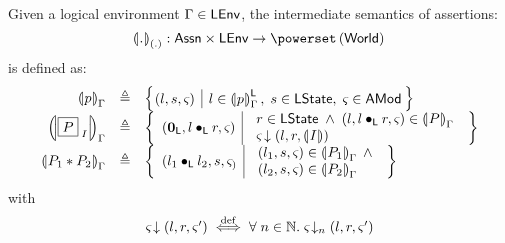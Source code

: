 %
%
\begin{definition}
Given a logical environment $\Gamma \in \textsf{LEnv}$, the intermediate semantics of assertions: 
%
\[
	\intermediateSem[\blankArg]{.}  :  \Assertions \times \LEnv \rightarrow \pset{\Worlds}\\
\]
%
is defined as: 
%
\[
\begin{array}{r c l}
	\intermediateSem{p} & \eqdef & 
	\left\{
	\hspace*{-0.15cm}
	\begin{array}{l | l}
	 \left( l, s, \amod{} \right) &
	 		l \in \semL{p},\; s \in \LState,\; \amod{} \in \AMods
	\end{array}
	\hspace*{-0.1cm}
	\right\}\\
	
	
	\intermediateSem{\shared{P}{I}} & \eqdef & 
	\left\{ 
	\begin{array}{l | l}
		(\unitL, l \composeL r, \amod{}) & 
		\begin{array}{l}
			r \in \LState \;\land\; (l, l \composeL r, \amod{}) \in \intermediateSem{P} \\
			\extendsAM{\amod}{l}{r}{\intermediateSemI{I} }
	
		\end{array}
	\end{array} \right\}\\
	
	
	\intermediateSem{P_1 * P_2} & \eqdef & 
	\left\{ 
	\begin{array}{l | l}
		(l_1 \composeL l_2, s, \amod)& 
		\begin{array}{l}
				 (l_1, s, \amod{}) \in \intermediateSem{P_1} \;\land\\
				 (l_2, s, \amod{}) \in \intermediateSem{P_2} 
		\end{array}
	\end{array} 
	\right\}
\end{array}
\]
%
with
%
\[
\begin{array}{l}
	\varsigma_{} \!\downarrow \left(l, r, \varsigma_{}'\right) \stackrel{\mathrm{def}}{\iff} \forall\; n \in \mathbb{N}.\; \varsigma_{} \!\downarrow_{n} \left(l, r, \varsigma_{}'\right) \\\\ 
	

\end{array}\]
\end{definition}
